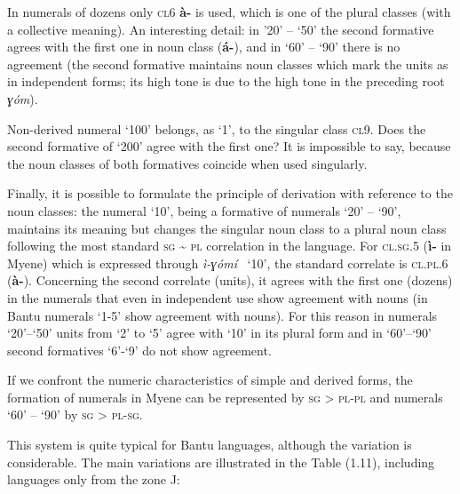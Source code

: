 In numerals of dozens only \textsc{cl}6 \textbf{à-}  is used, which is one of the plural classes (with a collective meaning). An interesting detail: in ’20’ – ‘50’ the second formative agrees with the first one in noun class  (\textbf{{\'{a}}-}), and in ‘60’ – ‘90’ there is no agreement (the second formative maintains noun classes which mark the units as in independent forms; its high tone is due to the high tone in the preceding root \textit{ɣ{\'{o}}m}). 

Non-derived numeral ‘100’ belongs, as ‘1’, to the singular class \textsc{cl}9. Does the second formative of ‘200’ agree with the first one? It is impossible to say, because the noun classes of both formatives coincide when used singularly. 

Finally, it is possible to formulate the principle of derivation with reference to the noun classes: the numeral ‘10’, being a formative of numerals ‘20’ – ‘90’, maintains its meaning but changes the singular noun class to a plural noun class following the most standard \textsc{sg} {\textasciitilde} \textsc{pl} correlation in the language. For \textsc{cl}.\textsc{sg}.5 (\textbf{ì-} in Myene) which is expressed through \textit{ì-}\textit{ɣ{\'{o}}m{\'{i}}} ~‘10’, the standard correlate is \textsc{cl}.\textsc{pl}.6 (\textbf{{\`{a}}-}). Concerning the second correlate (units), it agrees with the first one (dozens) in the numerals that even in independent use show agreement with nouns (in Bantu numerals ‘1-5’ show agreement with nouns). For this reason in numerals ‘20’–‘50’ units from ‘2’ to ‘5’ agree with ‘10’ in its plural form and in ‘60’–‘90’ second formatives ‘6’-‘9’ do not show agreement. 

If we confront the numeric characteristics of simple and derived forms, the formation of numerals in Myene can be represented by \textsc{sg} > \textsc{pl}-\textsc{pl} and numerals ‘60’ – ‘90’ by \textsc{sg} > \textsc{pl}-\textsc{sg}.

This system is quite typical for Bantu languages, although the variation is considerable. The main variations are illustrated in the Table (1.11), including languages only from the zone J: 

